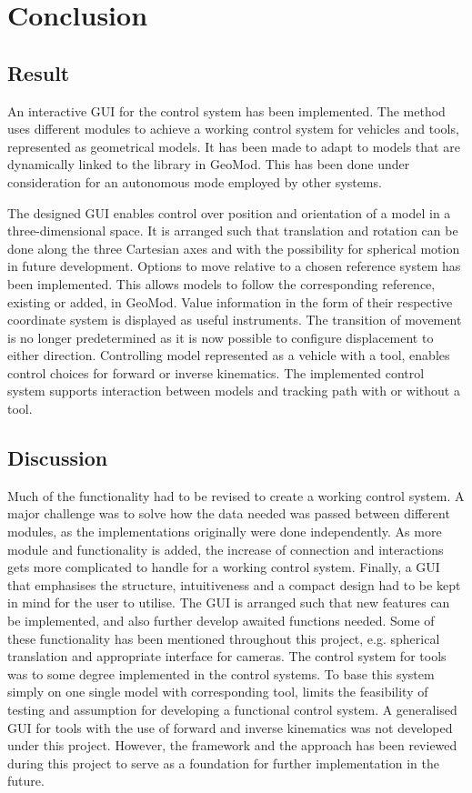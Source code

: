 \chapter{Conclusion}

\section{Result}
An interactive GUI for the control system has been implemented. The method uses different modules to achieve a working control system for vehicles and tools, represented as geometrical models. It has been made to adapt to models that are dynamically linked to the library in GeoMod. This has been done under consideration for an autonomous mode employed by other systems. 

The designed GUI enables control over position and orientation of a model in a three-dimensional space. It is arranged such that translation and rotation can be done along the three Cartesian axes and with the possibility for spherical motion in future development. Options to move relative to a chosen reference system has been implemented. This allows models to follow the corresponding reference, existing or added, in GeoMod. Value information in the form of their respective coordinate system is displayed as useful instruments. The transition of movement is no longer predetermined as it is now possible to configure displacement to either direction. Controlling model represented as a vehicle with a tool, enables control choices for forward or inverse kinematics. The implemented control system supports interaction between models and tracking path with or without a tool.

\section{Discussion}

Much of the functionality had to be revised to create a working control system. A major challenge was to solve how the data needed was passed between different modules, as the implementations originally were done independently. As more module and functionality is added, the increase of connection and interactions gets more complicated to handle for a working control system. Finally, a GUI that emphasises the structure, intuitiveness and a compact design had to be kept in mind for the user to utilise. The GUI is arranged such that new features can be implemented, and also further develop awaited functions needed. Some of these functionality has been mentioned throughout this project, e.g. spherical translation and appropriate interface for cameras. The control system for tools was to some degree implemented in the control systems. To base this system simply on one single model with corresponding tool, limits the feasibility of testing and assumption for developing a functional control system. A generalised GUI for tools with the use of forward and inverse kinematics was not developed under this project. However, the framework and the approach has been reviewed during this project to serve as a foundation for further implementation in the future.

